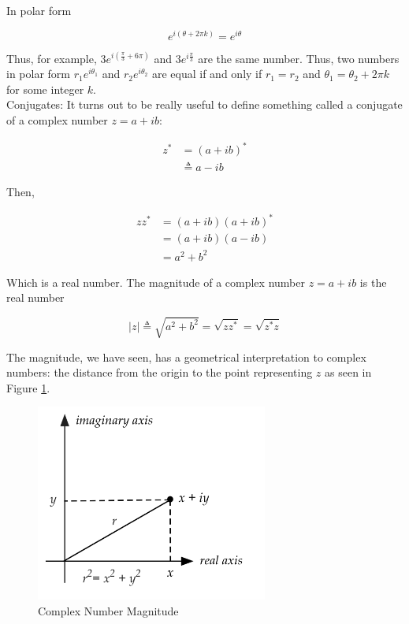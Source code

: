 \documentclass[main.tex]{subfiles}
\begin{document}
    In polar form
    
    $$e^{i(\theta+2 \pi k)}=e^{i \theta}$$
    
    Thus, for example, $3 e^{i\left(\frac{\pi}{3}+6 \pi\right)}$ and $3 e^{i \frac{\pi}{3}}$ are the same number. Thus, two numbers in polar form $r_{1} e^{i \theta_{1}}$ and $r_{2} e^{i \theta_{2}}$ are equal if and only if $r_{1}=r_{2}$ and $\theta_{1}=\theta_{2}+2 \pi k$ for some integer $k$.\\
    
    Conjugates: It turns out to be really useful to define something called a conjugate of a complex number $z=a+i b$:
    
    \begin{align*}
    z^{*} &=(a+i b)^{*} \\
    & \triangleq a-i b
    \end{align*}
    
    Then,
    
    \begin{align*}
    z z^{*} &=(a+i b)(a+i b)^{*} \\
    &=(a+i b)(a-i b) \\
    &=a^{2}+b^{2}
    \end{align*}
    
    Which is a real number. The magnitude of a complex number $z=a+i b$ is the real number
    
    $$|z| \triangleq \sqrt{a^{2}+b^{2}}=\sqrt{z z^{*}}=\sqrt{z^{*} z}$$
    
    The magnitude, we have seen, has a geometrical interpretation to complex numbers: the distance from the origin to the point representing $z$ as seen in Figure \ref{fig:04complexnumber2}.
    
    \begin{figure}
        \centering
        \includegraphics[width=3in]{notes/figs/n04/04complexnumber2.png}
        \caption{Complex Number Magnitude}
        \label{fig:04complexnumber2}
    \end{figure}
    
\end{document}
